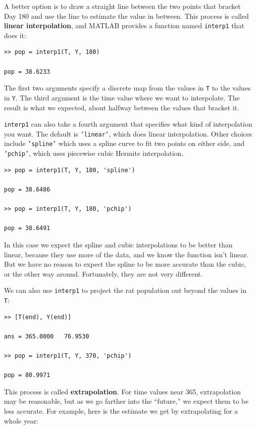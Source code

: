 \documentclass[
]{book}
\begin{document}
A better option is to draw a straight line between the two points that
bracket Day 180 and use the line to estimate the value in between.
This process is called {\bf linear interpolation}, and MATLAB provides
a function named {\tt interp1} that does it:

\begin{verbatim}
>> pop = interp1(T, Y, 180)

pop = 38.6233
\end{verbatim}

The first two arguments specify a discrete map from the values in
{\tt T} to the values in {\tt Y}.  The third argument is the
time value where we want to interpolate.  The result is what
we expected, about halfway between the values that bracket it.

{\tt interp1} can also take a fourth argument that specifies what
kind of interpolation you want.  The default is {\tt 'linear'}, which
does linear interpolation.  Other choices include {\tt 'spline'}
which uses a spline curve to fit two points on either side,
and {\tt 'pchip'}, which uses piecewise cubic Hermite interpolation.

\begin{verbatim}
>> pop = interp1(T, Y, 180, 'spline')

pop = 38.6486

>> pop = interp1(T, Y, 180, 'pchip')

pop = 38.6491
\end{verbatim}

In this case we expect the spline and cubic interpolations to be
better than linear, because they use more of the data, and we know the
function isn't linear.  But we have no reason to expect the spline to
be more accurate than the cubic, or the other way around.
Fortunately, they are not very different.

We can also use {\tt interp1} to project the rat population out
beyond the values in {\tt T}:

\begin{verbatim}
>> [T(end), Y(end)]

ans = 365.0000   76.9530

>> pop = interp1(T, Y, 370, 'pchip')

pop = 80.9971
\end{verbatim}

This process is called {\bf extrapolation}.  For time values near
365, extrapolation may be reasonable, but as we go farther into
the ``future,'' we expect them to be less accurate.
For example, here is the estimate we get by extrapolating for a whole
year:
\end{document}
